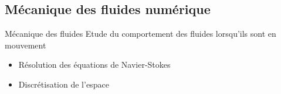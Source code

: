 \documentclass{beamer}
\begin{document}
\subsection{Mécanique des fluides numérique}
\begin{frame}
  \begin{block}{Mécanique des fluides}
    Etude du comportement des fluides lorsqu'ils sont en mouvement
  \end{block}
  
  \begin{itemize}
  \item Résolution des équations de Navier-Stokes
  \item Discrétisation de l'espace
  \end{itemize}
	\centering
\end{frame}
\end{document}
